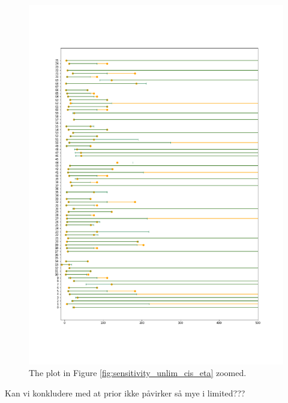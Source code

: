 \begin{figure}
    \centering
    \includegraphics[scale=0.36]{pictures/Sensitivity/ci_unlim_eta_zoomed.png}
    \caption[CIs for $\eta$, unlimited. Zoomed]{The plot in Figure \ref{fig:sensitivity_unlim_cis_eta} zoomed.}
    \label{fig:sensitivity_unlim_cis_eta_zoomed}
\end{figure}

Kan vi konkludere med at prior ikke påvirker så mye i limited???









